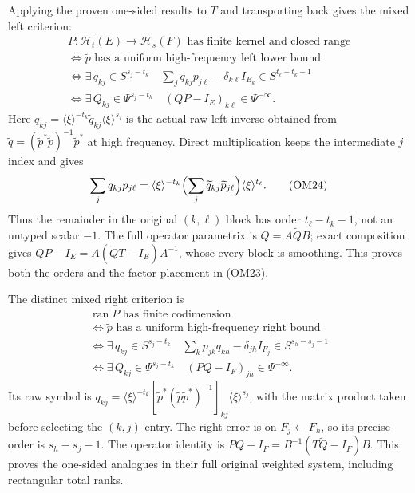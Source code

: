 \documentclass[
  11pt,
]{article}
\begin{document}
Applying the proven one-sided results to \(T\) and transporting back
gives the mixed left criterion: \[
 \begin{array}{c}
 P:\mathcal H_t(E)\to\mathcal H_s(F)
      \text{ has finite kernel and closed range}\\
 \Longleftrightarrow
 \widetilde p\text{ has a uniform high-frequency left lower bound}\\
 \Longleftrightarrow
 \exists\,q_{kj}\in S^{s_j-t_k}\quad
       \sum_jq_{kj}p_{j\ell}-\delta_{k\ell}I_{E_k}
          \in S^{t_\ell-t_k-1}\\
 \Longleftrightarrow
 \exists\,Q_{kj}\in\Psi^{s_j-t_k}\quad
       (QP-I_E)_{k\ell}\in\Psi^{-\infty}.
 \end{array}
 \tag{OM23}
\] Here \(q_{kj}=\langle\xi\rangle^{-t_k}\widetilde q_{kj}
\langle\xi\rangle^{s_j}\) is the actual raw left inverse obtained from
\(\widetilde q=(\widetilde p^*\widetilde p)^{-1}\widetilde p^*\) at high
frequency. Direct multiplication keeps the intermediate \(j\) index and
gives \[
 \sum_j q_{kj}p_{j\ell}
 =\langle\xi\rangle^{-t_k}
      \Bigl(\sum_j\widetilde q_{kj}\widetilde p_{j\ell}\Bigr)
        \langle\xi\rangle^{t_\ell}.
 \tag{OM24}
\] Thus the remainder in the original \((k,\ell)\) block has order
\(t_\ell-t_k-1\), not an untyped scalar \(-1\). The full operator
parametrix is \(Q=A\widetilde Q B\); exact composition gives
\(QP-I_E=A(\widetilde Q T-I_E)A^{-1}\), whose every block is smoothing.
This proves both the orders and the factor placement in (OM23).

The distinct mixed right criterion is \[
 \begin{array}{c}
 \operatorname{ran}P\text{ has finite codimension}\\
 \Longleftrightarrow
 \widetilde p\text{ has a uniform high-frequency right bound}\\
 \Longleftrightarrow
 \exists\,q_{kj}\in S^{s_j-t_k}\quad
       \sum_kp_{jk}q_{kh}-\delta_{jh}I_{F_j}
          \in S^{s_h-s_j-1}\\
 \Longleftrightarrow
 \exists\,Q_{kj}\in\Psi^{s_j-t_k}\quad
       (PQ-I_F)_{jh}\in\Psi^{-\infty}.
 \end{array}
 \tag{OM25}
\] Its raw symbol is \(q_{kj}=\langle\xi\rangle^{-t_k}
[\widetilde p^*(\widetilde p\widetilde p^*)^{-1}]_{kj}
\langle\xi\rangle^{s_j}\), with the matrix product taken before
selecting the \((k,j)\) entry. The right error is on
\(F_j\leftarrow F_h\), so its precise order is \(s_h-s_j-1\). The
operator identity is \(PQ-I_F=B^{-1}(T\widetilde Q-I_F)B\). This proves
the one-sided analogues in their full original weighted system,
including rectangular total ranks.
\end{document}
